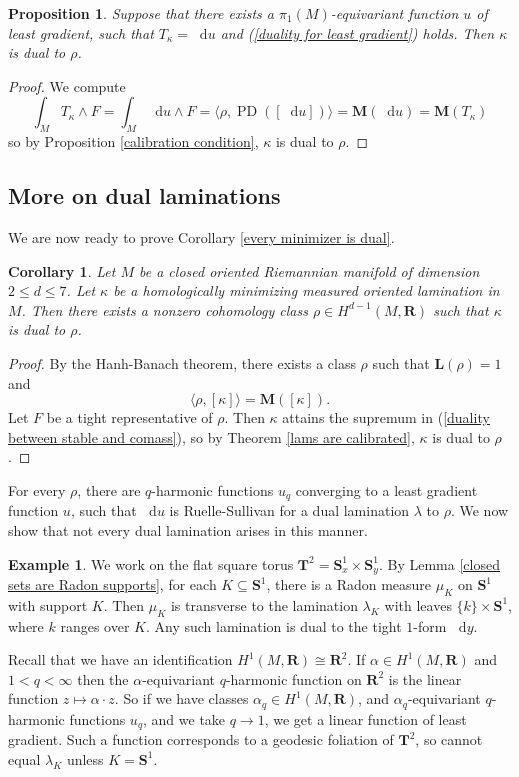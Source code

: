 \documentclass[reqno,11pt]{amsart}
\newcommand{\RR}{\mathbf{R}}
\newcommand{\Sph}{\mathbf S}
\newcommand*\dif{\mathop{}\!\mathrm{d}}
\DeclareMathOperator{\PD}{PD}
\newcommand{\Mass}{\mathbf M}
\newcommand{\Comass}{\mathbf L}
\newtheorem{proposition}[theorem]{Proposition}
\newtheorem{corollary}[theorem]{Corollary}
\theoremstyle{definition}
\newtheorem{example}[theorem]{Example}
\numberwithin{equation}{section}
\begin{document}
\begin{proposition}\label{least gradient implies dual}
Suppose that there exists a $\pi_1(M)$-equivariant function $u$ of least gradient, such that $T_\kappa = \dif u$ and (\ref{duality for least gradient}) holds.
Then $\kappa$ is dual to $\rho$.
\end{proposition}
\begin{proof}
We compute 
$$\int_M T_\kappa \wedge F = \int_M \dif u \wedge F = \langle \rho, \PD([\dif u])\rangle = \Mass(\dif u) = \Mass(T_\kappa)$$
so by Proposition \ref{calibration condition}, $\kappa$ is dual to $\rho$.
\end{proof}

\subsection{More on dual laminations}\label{dual lamination sec}
We are now ready to prove Corollary \ref{every minimizer is dual}.

\begin{corollary}
Let $M$ be a closed oriented Riemannian manifold of dimension $2 \leq d \leq 7$.
Let $\kappa$ be a homologically minimizing measured oriented lamination in $M$.
Then there exists a nonzero cohomology class $\rho \in H^{d - 1}(M, \RR)$ such that $\kappa$ is dual to $\rho$.
\end{corollary}
\begin{proof}
By the Hanh-Banach theorem, there exists a class $\rho$ such that $\Comass(\rho) = 1$ and
$$\langle \rho, [\kappa]\rangle = \Mass([\kappa]).$$
Let $F$ be a tight representative of $\rho$.
Then $\kappa$ attains the supremum in (\ref{duality between stable and comass}), so by Theorem \ref{lams are calibrated}, $\kappa$ is dual to $\rho$.
\end{proof}

For every $\rho$, there are $q$-harmonic functions $u_q$ converging to a least gradient function $u$, such that $\dif u$ is Ruelle-Sullivan for a dual lamination $\lambda$ to $\rho$.
We now show that not every dual lamination arises in this manner.

\begin{example}
We work on the flat square torus $\mathbf T^2 = \Sph^1_x \times \Sph^1_y$.
By Lemma \ref{closed sets are Radon supports}, for each $K \subseteq \Sph^1$, there is a Radon measure $\mu_K$ on $\Sph^1$ with support $K$.
Then $\mu_K$ is transverse to the lamination $\lambda_K$ with leaves $\{k\} \times \Sph^1$, where $k$ ranges over $K$.
Any such lamination is dual to the tight $1$-form $\dif y$.

Recall that we have an identification $H^1(M, \RR) \cong \RR^2$.
If $\alpha \in H^1(M, \RR)$ and $1 < q < \infty$ then the $\alpha$-equivariant $q$-harmonic function on $\RR^2$ is the linear function $z \mapsto \alpha \cdot z$.
So if we have classes $\alpha_q \in H^1(M, \RR)$, and $\alpha_q$-equivariant $q$-harmonic functions $u_q$, and we take $q \to 1$, we get a linear function of least gradient.
Such a function corresponds to a geodesic foliation of $\mathbf T^2$, so cannot equal $\lambda_K$ unless $K = \Sph^1$.
\end{example}
\end{document}
